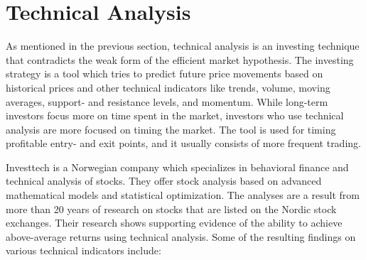 \section{Technical Analysis}
As mentioned in the previous section, technical analysis is an investing technique that contradicts the weak form of the efficient market hypothesis. The investing strategy is a tool which tries to predict future price movements based on historical prices and other technical indicators like trends, volume, moving averages, support- and resistance levels, and momentum. While long-term investors focus more on time spent in the market, investors who use technical analysis are more focused on timing the market. The tool is used for timing profitable entry- and exit points, and it usually consists of more frequent trading.   

\indent \newline 
Investtech is a Norwegian company which specializes in behavioral finance and technical analysis of stocks. They offer stock analysis based on advanced mathematical models and statistical optimization. The analyses are a result from more than 20 years of research on stocks that are listed on the Nordic stock exchanges. Their research shows supporting evidence of the ability to achieve above-average returns using technical analysis. Some of the resulting findings on various technical indicators include:

